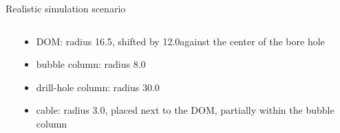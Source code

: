
\begin{frame}[fragile]{Realistic simulation scenario} %

  \begin{columns}
    \begin{column}{0.6\textwidth}


    \end{column}
    \begin{column}{0.4\textwidth}

      \begin{itemize}
        \item DOM: radius 16.5\cm, shifted by 12.0\cm against the center of the bore hole
        \item bubble column: radius 8.0\cm
        \item drill-hole column: radius 30.0\cm
        \item cable: radius 3.0\cm, placed next to the DOM, partially within the bubble column
      \end{itemize}

      \vspace{1cm}
    \end{column}
  \end{columns}

\end{frame}
